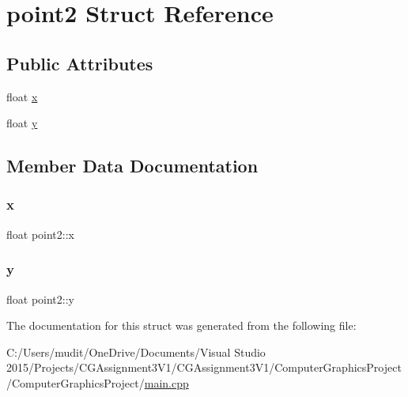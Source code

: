 \hypertarget{structpoint2}{}\section{point2 Struct Reference}
\label{structpoint2}
\subsection*{Public Attributes}
\begin{DoxyCompactItemize}
\item 
float \hyperlink{structpoint2_af86f4803413bae70a178353fec1c5e22}{x}
\item 
float \hyperlink{structpoint2_a64f49f325efdfcabff0eea0d81a58046}{y}
\end{DoxyCompactItemize}


\subsection{Member Data Documentation}
\hypertarget{structpoint2_af86f4803413bae70a178353fec1c5e22}{}\label{structpoint2_af86f4803413bae70a178353fec1c5e22} 
\subsubsection{\texorpdfstring{x}{x}}
{\footnotesize\ttfamily float point2\+::x}

\hypertarget{structpoint2_a64f49f325efdfcabff0eea0d81a58046}{}\label{structpoint2_a64f49f325efdfcabff0eea0d81a58046} 
\subsubsection{\texorpdfstring{y}{y}}
{\footnotesize\ttfamily float point2\+::y}



The documentation for this struct was generated from the following file\+:\begin{DoxyCompactItemize}
\item 
C\+:/\+Users/mudit/\+One\+Drive/\+Documents/\+Visual Studio 2015/\+Projects/\+C\+G\+Assignment3\+V1/\+C\+G\+Assignment3\+V1/\+Computer\+Graphics\+Project/\+Computer\+Graphics\+Project/\hyperlink{main_8cpp}{main.\+cpp}\end{DoxyCompactItemize}

